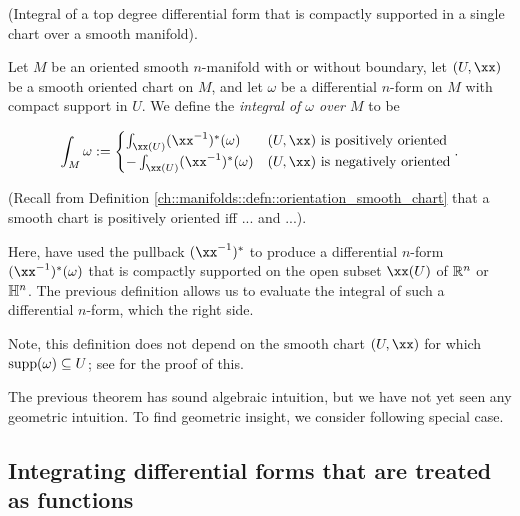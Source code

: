 \begin{defn}
\label{ch::diff_forms::defn::integral_over_single_chart}
     (Integral of a top degree differential form that is compactly supported in a single chart over a smooth manifold).
    
    Let $M$ be an oriented smooth $n$-manifold with or without boundary, let $(U, \xx)$ be a smooth oriented chart on $M$, and let $\omega$ be a differential $n$-form on $M$ with compact support in $U$. We define the \textit{integral of $\omega$ over $M$} to be
    
    \begin{align*}
        \int_M \omega := 
        \begin{cases}
            \int_{\xx(U)} (\xx^{-1})^*(\omega) & \text{$(U, \xx)$ is positively oriented} \\
            -\int_{\xx(U)} (\xx^{-1})^*(\omega) & \text{$(U, \xx)$ is negatively oriented}
        \end{cases}.
    \end{align*}
    
    (Recall from Definition \ref{ch::manifolds::defn::orientation_smooth_chart} that a smooth chart is positively oriented iff ... and ...).
    
    Here, have used the pullback $(\xx^{-1})^*$ to produce a differential $n$-form $(\xx^{-1})^*(\omega)$ that is compactly supported on the open subset $\xx(U)$ of $\mathbb{R}^n$ or $\mathbb{H}^n$. The previous definition allows us to evaluate the integral of such a differential $n$-form, which the right side.
    
    Note, this definition does not depend on the smooth chart $(U, \xx)$ for which $\text{supp}(\omega) \subseteq U$; see \cite[p. 404]{book::SM} for the proof of this.
\end{defn}

The previous theorem has sound algebraic intuition, but we have not yet seen any geometric intuition. To find geometric insight, we consider following special case.

\subsection*{Integrating differential forms that are treated as functions}

